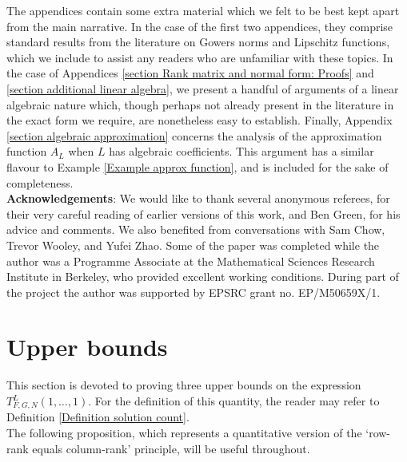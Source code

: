 \documentclass[12pt,a4paper,twoside,reqno]{amsart}
\numberwithin{equation}{section}
\begin{document}
The appendices contain some extra material which we felt to be best kept apart from the main narrative. In the case of the first two appendices, they comprise standard results from the literature on Gowers norms and Lipschitz functions, which we include to assist any readers who are unfamiliar with these topics. In the case of Appendices \ref{section Rank matrix and normal form: Proofs} and \ref{section additional linear algebra}, we present a handful of arguments of a linear algebraic nature which, though perhaps not already present in the literature in the exact form we require, are nonetheless easy to establish. Finally, Appendix \ref{section algebraic approximation} concerns the analysis of the approximation function $A_L$ when $L$ has algebraic coefficients. This argument has a similar flavour to Example \ref{Example approx function}, and is included for the sake of completeness. \\




\noindent \textbf{Acknowledgements}: We would like to thank several anonymous referees, for their very careful reading of earlier versions of this work, and Ben Green, for his advice and comments. We also benefited from conversations with Sam Chow, Trevor Wooley, and Yufei Zhao. Some of the paper was completed while the author was a Programme Associate at the Mathematical Sciences Research Institute in Berkeley, who provided excellent working conditions. During part of the project the author was supported by EPSRC grant no. EP/M50659X/1. \\





\section{Upper bounds}
\label{section upper bounds}
This section is devoted to proving three upper bounds on the expression\\ $T_{F,G,N}^L(1,\dots,1)$. For the definition of this quantity, the reader may refer to Definition \ref{Definition solution count}. \\

The following proposition, which represents a quantitative version of the `row-rank equals column-rank' principle, will be useful throughout.
\end{document}
